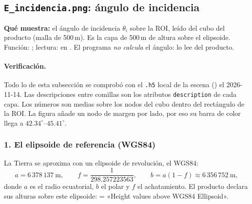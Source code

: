 \documentclass[11pt,a4paper]{article}
\begin{document}
\subsection{\texttt{E\_incidencia.png}: ángulo de incidencia}

\textbf{Qué muestra:} el ángulo de incidencia $\theta_i$ sobre la ROI, leído del cubo  del
producto (malla de 500\,m). Es la capa de 500\,m de altura sobre el elipsoide. Función: ; lectura:
 en . El programa \emph{no calcula} el ángulo: lo lee del producto.

\paragraph{Verificación.} Todo lo de esta subsección se comprobó con el \texttt{.h5} local de la escena
() el 2026-11-14. Las descripciones entre comillas son los atributos
\texttt{description} de cada capa. Los números son medias sobre los nodos del cubo dentro del rectángulo de la ROI. La figura añade un
nodo de margen por lado, por eso su barra de color llega a $42.34^\circ$--$45.41^\circ$.

\subsubsection*{1. El elipsoide de referencia (WGS84)}

La Tierra se aproxima con un elipsoide de revolución, el WGS84:
\begin{equation}
  a = 6\,378\,137\ \text{m}, \qquad f = \frac{1}{298.257223563}, \qquad b = a(1-f) \approx 6\,356\,752\ \text{m},
\end{equation}
donde $a$ es el radio ecuatorial, $b$ el polar y $f$ el achatamiento. El producto declara sus alturas sobre este elipsoide:
 = «Height values above WGS84 Ellipsoid».
\end{document}
